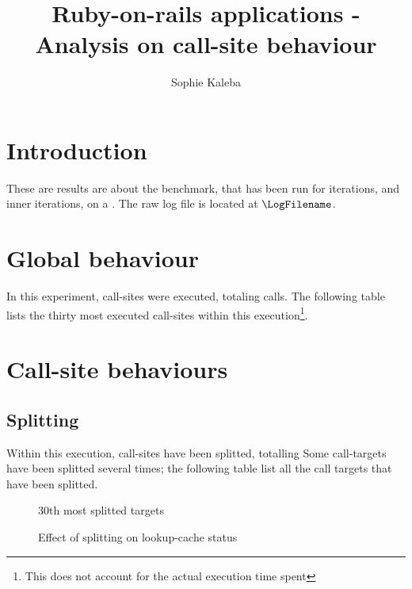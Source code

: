 \documentclass[preprint]{acmart}
\begin{document}
\title{Ruby-on-rails applications - Analysis on call-site behaviour}

\author{Sophie Kaleba}

\maketitle

\section{Introduction}

These are results are about the \BenchmarkName benchmark, that has been run for \NumIterations iterations, and \NumInnerIterations inner iterations, on a \Hihaho.
The raw log file is located at $\LogFilename$. 

\section{Global behaviour}

In this experiment, \NumberCallSites call-sites were executed, totaling \NumberCalls calls.  
The following table lists the thirty most executed call-sites within this execution\footnote{This does not account for the actual execution time spent}.

\MostExecutedCallSite

\section{Call-site behaviours}

\subsection{Splitting}

Within this execution, \NumOfSplittedTargets call-sites have been splitted, totalling \NumsOfSplits
Some call-targets have been splitted several times; the following table list all the call targets that have been splitted.

\newpage

\begin{figure}[h]
  \centering
  \Splitting
  \caption{
    30th most splitted targets}
\end{figure}

\begin{figure}[h]
  \centering
  \EffectSplitting
  \caption{
    Effect of splitting on lookup-cache status}
\end{figure}
\end{document}
